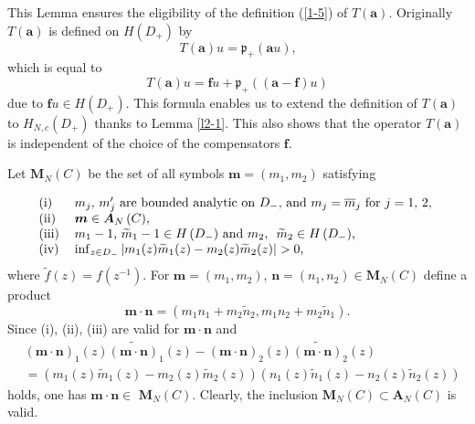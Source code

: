 \documentclass[a4paper]{article}%
\begin{document}
This Lemma ensures the eligibility of the definition (\ref{1-5}) of $T\left(
\boldsymbol{a}\right)  $. Originally $T\left(  \boldsymbol{a}\right)  $ is
defined on $H\left(  D_{+}\right)  $ by%
\[
T\left(  \boldsymbol{a}\right)  u=\mathfrak{p}_{+}\left(  \boldsymbol{a}%
u\right)  \text{,}%
\]
which is equal to%
\begin{equation}
T\left(  \boldsymbol{a}\right)  u=\boldsymbol{f}u+\mathfrak{p}_{+}\left(
\left(  \boldsymbol{a}-\boldsymbol{f}\right)  u\right)  \label{2-3}%
\end{equation}
due to $\boldsymbol{f}u\in H\left(  D_{+}\right)  $. This formula enables us
to extend the definition of $T\left(  \boldsymbol{a}\right)  $ to
$H_{N,c}\left(  D_{+}\right)  $ thanks to Lemma \ref{l2-1}. This also shows
that the operator $T\left(  \boldsymbol{a}\right)  $ is independent of the
choice of the compensators $\boldsymbol{f}$.

Let $\boldsymbol{M}_{N}\left(  C\right)  $ be the set of all symbols
$\boldsymbol{m}=\left(  m_{1},m_{2}\right)  $ satisfying%

\begin{equation}%
\begin{tabular}
[c]{ll}%
(i) & $m_{j}$, $m_{j}^{\prime}$ are bounded analytic on $D_{-}$, and
$m_{j}=\overline{m}_{j}$ for $j=1$, $2$,\\
(ii) & $\boldsymbol{m}\in\boldsymbol{A}_{N}\left(  C\right)  $,\\
(iii) & $m_{1}-1$, $\widetilde{m}_{1}-1\in H\left(  D_{-}\right)  $ and
$m_{2}$, $\ \widetilde{m}_{2}\in H\left(  D_{-}\right)  $,\\
(iv) & $\inf_{z\in D_{-}}\left\vert m_{1}(z)\widetilde{m}_{1}(z)-m_{2}%
(z)\widetilde{m}_{2}(z)\right\vert >0$,
\end{tabular}
\ \label{2-4}%
\end{equation}
where $\widetilde{f}\left(  z\right)  =f\left(  z^{-1}\right)  $. For
$\boldsymbol{m}=\left(  m_{1},m_{2}\right)  $, $\boldsymbol{n}=\left(
n_{1},n_{2}\right)  \in\boldsymbol{M}_{N}\left(  C\right)  $ define a product%
\[
\boldsymbol{m}\cdot\boldsymbol{n}=\left(  m_{1}n_{1}+m_{2}\widetilde{n}%
_{2},m_{1}n_{2}+m_{2}\widetilde{n}_{1}\right)  \text{.}%
\]
Since (i), (ii), (iii) are valid for $\boldsymbol{m}\cdot\boldsymbol{n}$ and
\begin{align*}
&  \left(  \boldsymbol{m}\cdot\boldsymbol{n}\right)  _{1}(z)\widetilde{\left(
\boldsymbol{m}\cdot\boldsymbol{n}\right)  }_{1}(z)-\left(  \boldsymbol{m}%
\cdot\boldsymbol{n}\right)  _{2}(z)\widetilde{\left(  \boldsymbol{m}%
\cdot\boldsymbol{n}\right)  }_{2}(z)\\
&  =\left(  m_{1}(z)\widetilde{m}_{1}(z)-m_{2}(z)\widetilde{m}_{2}(z)\right)
\left(  n_{1}(z)\widetilde{n}_{1}(z)-n_{2}(z)\widetilde{n}_{2}(z)\right)
\end{align*}
holds, one has $\boldsymbol{m}\cdot\boldsymbol{n}\in$ $\boldsymbol{M}%
_{N}\left(  C\right)  $. Clearly, the inclusion $\boldsymbol{M}_{N}\left(
C\right)  \subset\boldsymbol{A}_{N}\left(  C\right)  $ is valid.
\end{document}

